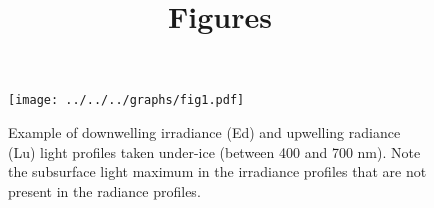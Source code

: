 \documentclass[12pt,a4paper]{scrartcl}
\title{Figures}
\date{}
\begin{document}
    \maketitle
    
     \begin{figure}[h]
         \centering
         \texttt{[image: ../../../graphs/fig1.pdf]}
         \caption{Example of downwelling irradiance (Ed) and upwelling radiance (Lu) light profiles taken under-ice (between 400 and 700 nm). Note the subsurface light maximum in the irradiance profiles that are not present in the radiance profiles.}
     \end{figure}
    
    \clearpage
    \newpage

    
\end{document}
